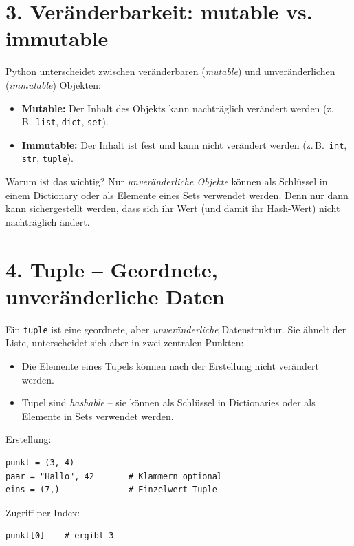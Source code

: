 \documentclass[12pt]{article}
\begin{document}
	\section*{3. Veränderbarkeit: mutable vs. immutable}
	
	Python unterscheidet zwischen veränderbaren (\emph{mutable}) und unveränderlichen (\emph{immutable}) Objekten:
	
	\begin{itemize}
		\item \textbf{Mutable:} Der Inhalt des Objekts kann nachträglich verändert werden (z.\,B.\ \texttt{list}, \texttt{dict}, \texttt{set}).
		\item \textbf{Immutable:} Der Inhalt ist fest und kann nicht verändert werden (z.\,B.\ \texttt{int}, \texttt{str}, \texttt{tuple}).
	\end{itemize}
	
	Warum ist das wichtig? Nur \emph{unveränderliche Objekte} können als Schlüssel in einem Dictionary oder als Elemente eines Sets verwendet werden. Denn nur dann kann sichergestellt werden, dass sich ihr Wert (und damit ihr Hash-Wert) nicht nachträglich ändert.
	
	\section*{4. Tuple – Geordnete, unveränderliche Daten}
	
	Ein \texttt{tuple} ist eine geordnete, aber \emph{unveränderliche} Datenstruktur. Sie ähnelt der Liste, unterscheidet sich aber in zwei zentralen Punkten:
	
	\begin{itemize}
		\item Die Elemente eines Tupels können nach der Erstellung nicht verändert werden.
		\item Tupel sind \emph{hashable} – sie können als Schlüssel in Dictionaries oder als Elemente in Sets verwendet werden.
	\end{itemize}
	
	Erstellung:
	
\begin{verbatim}
punkt = (3, 4)
paar = "Hallo", 42       # Klammern optional
eins = (7,)              # Einzelwert-Tuple
\end{verbatim}
	
	Zugriff per Index:
	
\begin{verbatim}
punkt[0]    # ergibt 3
\end{verbatim}
	
\end{document}
